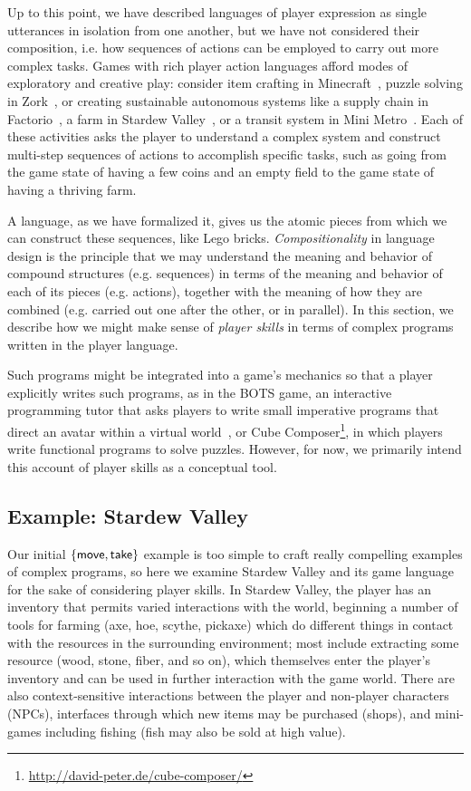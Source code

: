 Up to this point, we have described languages of player expression as
single utterances in isolation from one another, but we have not considered
their composition, i.e. how sequences of actions can be employed to carry out
more complex tasks. Games with rich player action languages afford modes of
exploratory and creative play: consider item crafting in
Minecraft~\cite{minecraft}, puzzle solving in Zork~\cite{blank1980zork}, or
creating sustainable autonomous systems like a supply chain in
Factorio~\cite{factorio}, a farm in Stardew Valley~\cite{stardew}, or a
transit system in Mini Metro~\cite{minimetro}.  Each of these activities
asks the player to understand a complex system and construct multi-step
sequences of actions to accomplish specific tasks, such as going from the
game state of having a few coins and an empty field to the game state of
having a thriving farm.

A language, as we have formalized it, gives us the atomic pieces from which
we can construct these sequences, like Lego bricks. {\em Compositionality}
in language design is the principle that we may understand the meaning and
behavior of compound structures (e.g. sequences) in terms of the meaning
and behavior of each of its pieces (e.g. actions), together with the
meaning of how they are combined (e.g. carried out one after the other, or
in parallel). In this section, we describe how we might make sense of {\em
player skills} in terms of complex programs written in the player language.

Such programs might be integrated into a game's mechanics so that a player
explicitly writes such programs, as in the BOTS game, an interactive
programming tutor that asks players to write small imperative programs that
direct an avatar within a virtual world~\cite{hicks2012creation}, or Cube
Composer\footnote{\url{http://david-peter.de/cube-composer/}}, in which
players write functional programs to solve puzzles. However, for now, we
primarily intend this account of player skills as a conceptual tool.

\subsection{Example: Stardew Valley}
\newcommand{\param}[1]{\langle #1 \rangle}
\newcommand{\syn}[1]{\mathsf{#1}}

Our initial $\{\mathsf{move}, \mathsf{take}\}$ example is too simple to craft really
compelling examples of complex programs, so here we examine
Stardew Valley and its game language for the sake of considering player
skills. In Stardew Valley, the player has an inventory that permits varied
interactions with the world, beginning a number of tools for farming (axe,
hoe, scythe, pickaxe) which do different things in contact with the
resources in the surrounding environment; most include extracting some
resource (wood, stone, fiber, and so on), which themselves enter the
player's inventory and can be used in further interaction with the game
world. There are also context-sensitive interactions between the player and
non-player characters (NPCs), interfaces through which new items may be
purchased (shops), and mini-games including fishing (fish may also be sold
at high value).

